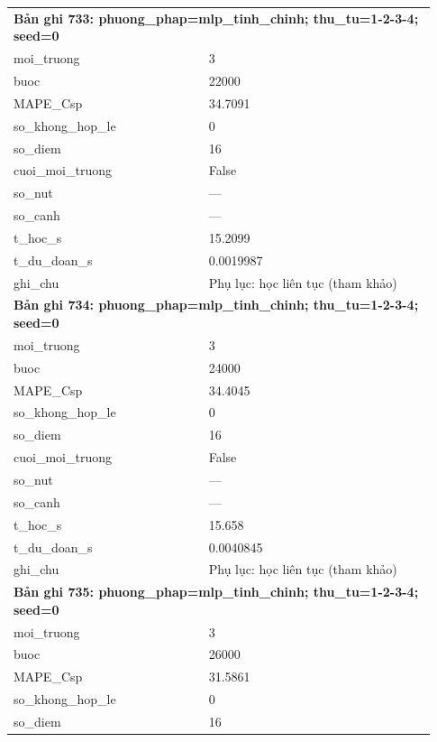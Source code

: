 \begin{longtable}{p{0.43\linewidth}p{0.50\linewidth}}
\midrule
\multicolumn{2}{p{0.95\linewidth}}{\textbf{Bản ghi 733: phuong\_phap=mlp\_tinh\_chinh; thu\_tu=1-2-3-4; seed=0}} \\
moi\_\allowbreak truong & 3 \\
buoc & 22000 \\
MAPE\_\allowbreak Csp & 34.7091 \\
so\_\allowbreak khong\_\allowbreak hop\_\allowbreak le & 0 \\
so\_\allowbreak diem & 16 \\
cuoi\_\allowbreak moi\_\allowbreak truong & False \\
so\_\allowbreak nut & — \\
so\_\allowbreak canh & — \\
t\_\allowbreak hoc\_\allowbreak s & 15.2099 \\
t\_\allowbreak du\_\allowbreak doan\_\allowbreak s & 0.0019987 \\
ghi\_\allowbreak chu & Phụ lục: học liên tục (tham khảo) \\
\midrule
\multicolumn{2}{p{0.95\linewidth}}{\textbf{Bản ghi 734: phuong\_phap=mlp\_tinh\_chinh; thu\_tu=1-2-3-4; seed=0}} \\
moi\_\allowbreak truong & 3 \\
buoc & 24000 \\
MAPE\_\allowbreak Csp & 34.4045 \\
so\_\allowbreak khong\_\allowbreak hop\_\allowbreak le & 0 \\
so\_\allowbreak diem & 16 \\
cuoi\_\allowbreak moi\_\allowbreak truong & False \\
so\_\allowbreak nut & — \\
so\_\allowbreak canh & — \\
t\_\allowbreak hoc\_\allowbreak s & 15.658 \\
t\_\allowbreak du\_\allowbreak doan\_\allowbreak s & 0.0040845 \\
ghi\_\allowbreak chu & Phụ lục: học liên tục (tham khảo) \\
\midrule
\multicolumn{2}{p{0.95\linewidth}}{\textbf{Bản ghi 735: phuong\_phap=mlp\_tinh\_chinh; thu\_tu=1-2-3-4; seed=0}} \\
moi\_\allowbreak truong & 3 \\
buoc & 26000 \\
MAPE\_\allowbreak Csp & 31.5861 \\
so\_\allowbreak khong\_\allowbreak hop\_\allowbreak le & 0 \\
so\_\allowbreak diem & 16 \\

\end{longtable}
